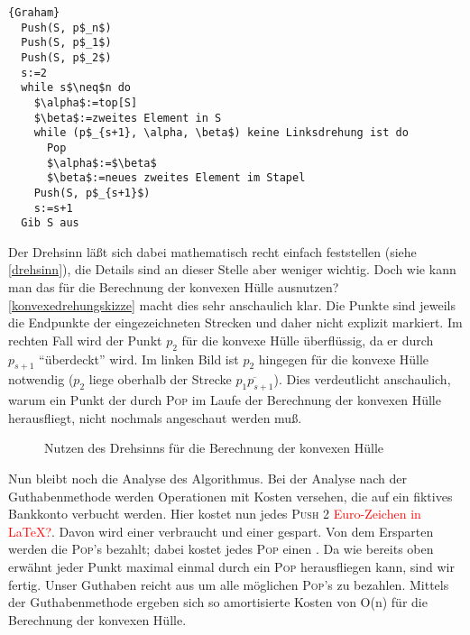 \begin{Algorithmus}[H]
\begin{lstlisting}[frame=tlrb, mathescape=true, title=\textsc{Graham}, gobble=1]{Graham}
  Push(S, p$_n$)
  Push(S, p$_1$)
  Push(S, p$_2$)
  s:=2
  while s$\neq$n do
    $\alpha$:=top[S]
    $\beta$:=zweites Element in S
    while (p$_{s+1}, \alpha, \beta$) keine Linksdrehung ist do
      Pop
      $\alpha$:=$\beta$
      $\beta$:=neues zweites Element im Stapel
    Push(S, p$_{s+1}$)
    s:=s+1
  Gib S aus    
\end{lstlisting}
\end{Algorithmus}

Der Drehsinn läßt sich dabei mathematisch recht einfach feststellen (siehe \autoref{drehsinn}), die Details sind an dieser Stelle
aber weniger wichtig.
Doch wie kann man das für die Berechnung
der konvexen Hülle ausnutzen? \autoref{konvexedrehungskizze} macht dies sehr anschaulich klar. Die Punkte sind jeweils die
Endpunkte der eingezeichneten Strecken und daher nicht explizit markiert. Im rechten Fall wird der Punkt $p_2$ für die konvexe Hülle
überflüssig, da er durch $p_{s+1}$ "`überdeckt"' wird. Im linken Bild ist $p_2$ hingegen für die konvexe Hülle notwendig ($p_2$
liege oberhalb der Strecke $\overline{p_1p_{s+1}}$). Dies verdeutlicht anschaulich, warum ein Punkt der durch
\textsc{Pop} im Laufe der Berechnung der konvexen Hülle herausfliegt, nicht nochmals angeschaut werden muß.

\begin{figure}[H]
\centering


\caption{Nutzen des Drehsinns für die Berechnung der konvexen Hülle}
\label{konvexedrehungskizze}
\end{figure}

Nun bleibt noch die Analyse des Algorithmus. Bei der Analyse nach der Guthabenmethode werden Operationen mit Kosten versehen, die auf ein fiktives Bankkonto
verbucht werden. Hier kostet nun jedes \textsc{Push} 2 \textcolor{red}{Euro-Zeichen in LaTeX?}. Davon wird einer verbraucht und einer
gespart. Von dem Ersparten werden die \textsc{Pop}'s bezahlt; dabei kostet jedes \textsc{Pop} einen . Da wie bereits oben erwähnt jeder
Punkt maximal einmal durch ein \textsc{Pop} herausfliegen kann, sind wir fertig. Unser Guthaben reicht aus um alle möglichen
\textsc{Pop}'s zu bezahlen. Mittels der Guthabenmethode ergeben sich so amortisierte Kosten von O(n) für die Berechnung der konvexen
Hülle.

